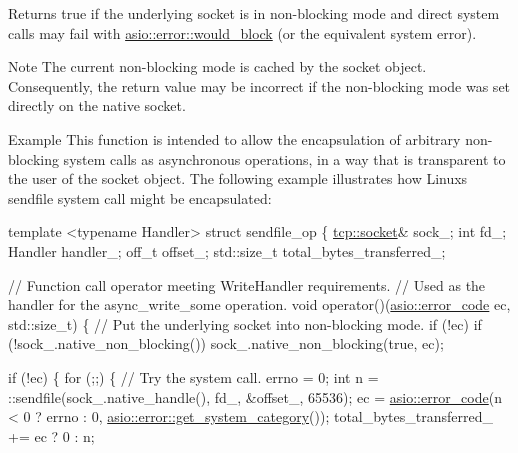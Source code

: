 \begin{DoxyReturn}{Returns}
{\ttfamily true} if the underlying socket is in non-\/blocking mode and direct system calls may fail with \hyperlink{namespaceasio_1_1error_a2a69445eee784059ac2f4a6c4f5fe90da8e8ff1984495eb85ec17c37e3e5a89e5}{asio\+::error\+::would\+\_\+block} (or the equivalent system error).
\end{DoxyReturn}
\begin{DoxyNote}{Note}
The current non-\/blocking mode is cached by the socket object. Consequently, the return value may be incorrect if the non-\/blocking mode was set directly on the native socket.
\end{DoxyNote}
\begin{DoxyParagraph}{Example}
This function is intended to allow the encapsulation of arbitrary non-\/blocking system calls as asynchronous operations, in a way that is transparent to the user of the socket object. The following example illustrates how Linux\textquotesingle{}s {\ttfamily sendfile} system call might be encapsulated\+: 
\begin{DoxyCode}
 \textcolor{keyword}{template} <\textcolor{keyword}{typename} Handler>
\textcolor{keyword}{struct }sendfile\_op
\{
  \hyperlink{namespacewebsocketpp_1_1transport_1_1asio_1_1socket_1_1error_a828ddaa5ed63a761e1b557465a35f05aa0c31b356014843e1d09514e794a539a7}{tcp::socket}& sock\_;
  \textcolor{keywordtype}{int} fd\_;
  Handler handler\_;
  off\_t offset\_;
  std::size\_t total\_bytes\_transferred\_;

  \textcolor{comment}{// Function call operator meeting WriteHandler requirements.}
  \textcolor{comment}{// Used as the handler for the async\_write\_some operation.}
  \textcolor{keywordtype}{void} operator()(\hyperlink{classasio_1_1error__code}{asio::error\_code} ec, std::size\_t)
  \{
    \textcolor{comment}{// Put the underlying socket into non-blocking mode.}
    \textcolor{keywordflow}{if} (!ec)
      \textcolor{keywordflow}{if} (!sock\_.native\_non\_blocking())
        sock\_.native\_non\_blocking(\textcolor{keyword}{true}, ec);

    \textcolor{keywordflow}{if} (!ec)
    \{
      \textcolor{keywordflow}{for} (;;)
      \{
        \textcolor{comment}{// Try the system call.}
        errno = 0;
        \textcolor{keywordtype}{int} n = ::sendfile(sock\_.native\_handle(), fd\_, &offset\_, 65536);
        ec = \hyperlink{classasio_1_1error__code}{asio::error\_code}(n < 0 ? errno : 0,
            \hyperlink{namespaceasio_1_1error_ab830b9c09076398a1b0e72f619eb0204}{asio::error::get\_system\_category}());
        total\_bytes\_transferred\_ += ec ? 0 : n;


\end{DoxyCode}
\end{DoxyParagraph}
